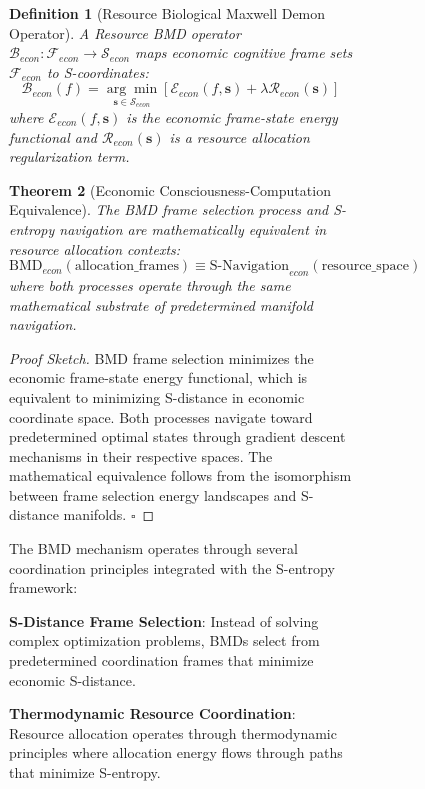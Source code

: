\documentclass[12pt,a4paper]{article}
\newtheorem{theorem}{Theorem}
\newtheorem{definition}[theorem]{Definition}
\begin{document}
\begin{figure}[H]
\begin{figure}[H]
\begin{definition}[Resource Biological Maxwell Demon Operator]
A Resource BMD operator $\mathcal{B}_{econ}: \mathcal{F}_{econ} \to \mathcal{S}_{econ}$ maps economic cognitive frame sets $\mathcal{F}_{econ}$ to S-coordinates:
\begin{equation}
\mathcal{B}_{econ}(f) = \underset{\mathbf{s} \in \mathcal{S}_{econ}}{\arg\min} \left[ \mathcal{E}_{econ}(f, \mathbf{s}) + \lambda \mathcal{R}_{econ}(\mathbf{s}) \right]
\end{equation}
where $\mathcal{E}_{econ}(f, \mathbf{s})$ is the economic frame-state energy functional and $\mathcal{R}_{econ}(\mathbf{s})$ is a resource allocation regularization term.
\end{definition}

\begin{theorem}[Economic Consciousness-Computation Equivalence]
The BMD frame selection process and S-entropy navigation are mathematically equivalent in resource allocation contexts:
\begin{equation}
\text{BMD}_{econ}(\text{allocation\_frames}) \equiv \text{S-Navigation}_{econ}(\text{resource\_space})
\end{equation}
where both processes operate through the same mathematical substrate of predetermined manifold navigation.
\end{theorem}

\begin{proof}[Proof Sketch]
BMD frame selection minimizes the economic frame-state energy functional, which is equivalent to minimizing S-distance in economic coordinate space. Both processes navigate toward predetermined optimal states through gradient descent mechanisms in their respective spaces. The mathematical equivalence follows from the isomorphism between frame selection energy landscapes and S-distance manifolds. $\square$
\end{proof}

The BMD mechanism operates through several coordination principles integrated with the S-entropy framework:

\textbf{S-Distance Frame Selection}: Instead of solving complex optimization problems, BMDs select from predetermined coordination frames that minimize economic S-distance.

\textbf{Thermodynamic Resource Coordination}: Resource allocation operates through thermodynamic principles where allocation energy flows through paths that minimize S-entropy.


\end{figure}
\end{figure}
\end{document}
